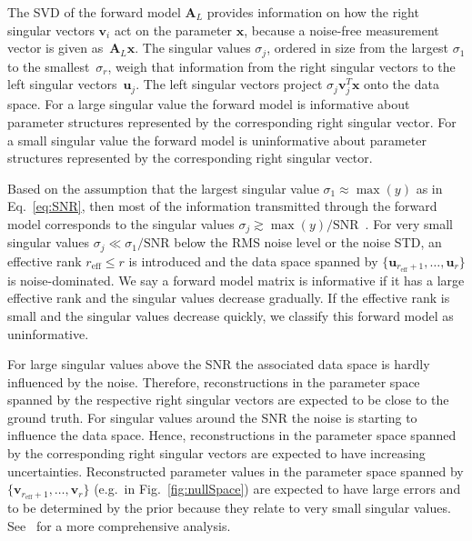 The SVD of the forward model $\bm{A}_L$ provides information on how the right singular vectors $\bm{v}_i$ act on the parameter $\bm{x}$, because a noise-free measurement vector is given as~$\bm{A}_L\bm{x}$.
The singular values $\sigma_j $, ordered in size from the largest $\sigma_1$ to the smallest~$\sigma_{r}$, weigh that information from the right singular vectors to the left singular vectors~$\bm{u}_j$.
The left singular vectors project $\sigma_j \bm{v}^T_j \bm{x} $ onto the data space.
For a large singular value the forward model is informative about parameter structures represented by the corresponding right singular vector. 
For a small singular value the forward model is uninformative about parameter structures represented by the corresponding right singular vector.

Based on the assumption that the largest singular value $\sigma_1  \approx \max(y)$ as in Eq.~\ref{eq:SNR}, then most of the information transmitted through the forward model corresponds to the singular values $\sigma_j \gtrsim \max(y)/ \text{SNR}$~\cite{fox2025BlokkLecNot}.
For very small singular values $\sigma_j \ll \sigma_1/\text{SNR}$ below the RMS noise level or the noise STD, an effective rank $r_{\text{eff}} \leq r$ is introduced and the data space spanned by $ \{\bm{u}_{r_{\text{eff}} +1}, \dots ,\bm{u}_r \}$ is noise-dominated.
We say a forward model matrix is informative if it has a large effective rank and the singular values decrease gradually.
If the effective rank is small and the singular values decrease quickly, we classify this forward model as uninformative.

For large singular values above the SNR the associated data space is hardly influenced by the noise.
Therefore, reconstructions in the parameter space spanned by the respective right singular vectors are expected to be close to the ground truth.
For singular values around the SNR the noise is starting to influence the data space.
Hence, reconstructions in the parameter space spanned by the corresponding right singular vectors are expected to have increasing uncertainties.
Reconstructed parameter values in the parameter space spanned by $ \{\bm{v}_{r_{\text{eff}} +1}, \dots ,\bm{v}_r \}$ (e.g.~in Fig.~\ref{fig:nullSpace}) are expected to have large errors and to be determined by the prior because they relate to very small singular values.
See~\cite{tan2016LecNot} for a more comprehensive analysis.


